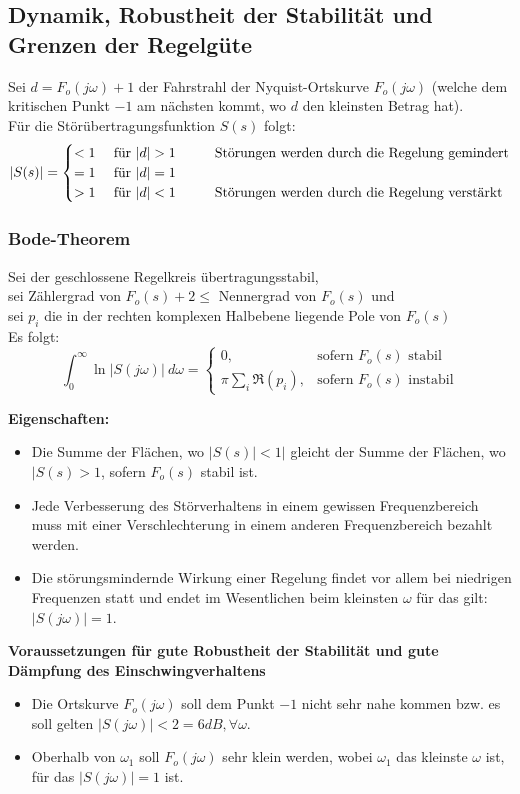 \documentclass[10pt,a4paper]{article}
\newcommand{\tab}[1][1]{\hspace*{#1cm}}
\begin{document}
\subsection{Dynamik, Robustheit der Stabilität und Grenzen der Regelgüte}
Sei $d = F_o(j \omega) + 1$ der Fahrstrahl der Nyquist-Ortskurve $F_o(j \omega)$ (welche dem kritischen Punkt $-1$ am nächsten kommt, wo $d$ den kleinsten Betrag hat). \\
Für die Störübertragungsfunktion $S(s)$ folgt:
$$
	|S(s)| = \begin{cases}
		< 1 & \text{ für } |d| > 1  \tab\text{Störungen werden durch die Regelung gemindert}\\
		= 1 & \text{ für } |d| = 1 \\
		> 1 & \text{ für } |d| < 1  \tab\text{Störungen werden durch die Regelung verstärkt}\\
	\end{cases}
$$

\subsubsection{Bode-Theorem}
Sei der geschlossene Regelkreis übertragungsstabil, \\
sei Zählergrad von $F_o(s) + 2 ≤ $ Nennergrad von $F_o(s)$ und \\
sei $p_i$ die in der rechten komplexen Halbebene liegende Pole von $F_o(s)$ \\
Es folgt:
$$
	\int_0^∞ \ln|S(j \omega)| ~d \omega = 
	\begin{cases}
		0, & \text{sofern $F_o(s)$ stabil} \\
		\pi \sum_i  \Re(p_i), & \text{sofern $F_o(s)$ instabil}
	\end{cases}
$$

\textbf{Eigenschaften:}
\begin{itemize}
	\item Die Summe der Flächen, wo $|S(s)| < 1|$ gleicht der Summe der Flächen, wo $|S(s) > 1$, sofern $F_o(s)$ stabil ist.
	\item Jede Verbesserung des Störverhaltens in einem gewissen Frequenzbereich muss mit einer Verschlechterung in einem anderen Frequenzbereich bezahlt werden.
	\item Die störungsmindernde Wirkung einer Regelung findet vor allem bei niedrigen Frequenzen statt und endet im Wesentlichen beim kleinsten $\omega$ für das gilt: $|S(j \omega)| = 1$.
\end{itemize}

\textbf{Voraussetzungen für gute Robustheit der Stabilität und gute Dämpfung des Einschwingverhaltens}
\begin{itemize}
	\item Die Ortskurve $F_o(j \omega)$ soll dem Punkt $-1$ nicht sehr nahe kommen bzw. es soll gelten $|S(j \omega)| < 2 = 6dB, \forall \omega$.
	\item Oberhalb von $\omega_1$ soll $F_o(j \omega)$ sehr klein werden, wobei $\omega_1$ das kleinste $\omega$ ist, für das $|S(j \omega)| = 1$ ist.
\end{itemize}
\end{document}
